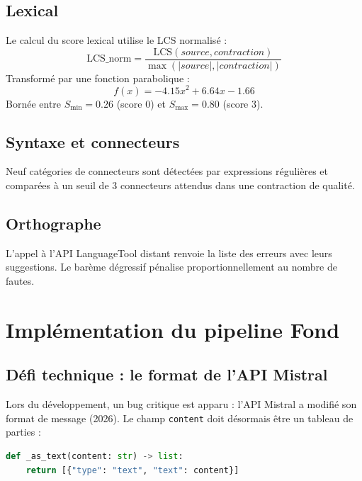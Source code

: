 \subsection{Lexical}

Le calcul du score lexical utilise le LCS normalisé :
\begin{equation}
\text{LCS\_norm} = \frac{\text{LCS}(source, contraction)}{\max(|source|, |contraction|)}
\end{equation}
Transformé par une fonction parabolique :
\begin{equation}
f(x) = -4.15x^2 + 6.64x - 1.66
\end{equation}
Bornée entre \(S_{\min}=0.26\) (score 0) et \(S_{\max}=0.80\) (score 3).

\subsection{Syntaxe et connecteurs}

Neuf catégories de connecteurs sont détectées par expressions régulières et comparées à un seuil de 3 connecteurs attendus dans une contraction de qualité.

\subsection{Orthographe}

L'appel à l'API LanguageTool distant renvoie la liste des erreurs avec leurs suggestions. Le barème dégressif pénalise proportionnellement au nombre de fautes.

\section{Implémentation du pipeline Fond}

\subsection{Défi technique : le format de l'API Mistral}

Lors du développement, un bug critique est apparu : l'API Mistral a modifié son format de message (2026). Le champ \texttt{content} doit désormais être un tableau de parties :

\begin{lstlisting}[caption=Correctif du format content pour Mistral API 2026,language=Python]
def _as_text(content: str) -> list:
    return [{"type": "text", "text": content}]
\end{lstlisting}

